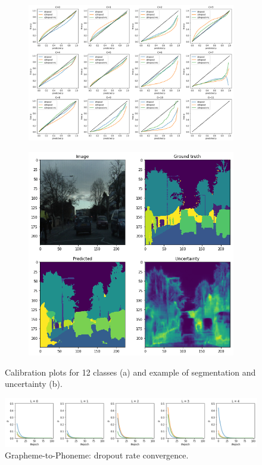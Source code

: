 \documentclass{article}
\begin{document}
\begin{figure}[!h]
\centering
\begin{subfigure}{.5\textwidth}
  \centering
  \includegraphics[width=\linewidth]{calibration_plots.png}
\end{subfigure}%
\begin{subfigure}{.5\textwidth}
  \centering
  \includegraphics[width=0.7\linewidth]{preview_results.png}
\end{subfigure}
\caption{Calibration plots for 12 classes (a) and example of segmentation and uncertainty (b).}
\label{fig:calib_ex}
\end{figure}

\begin{figure}[!h]
\centering
\centering
\includegraphics[width=\linewidth]{nlp_probs.png}
\caption{Grapheme-to-Phoneme: dropout rate convergence.}
\label{fig:nlpprobs}
\end{figure}
\end{document}
